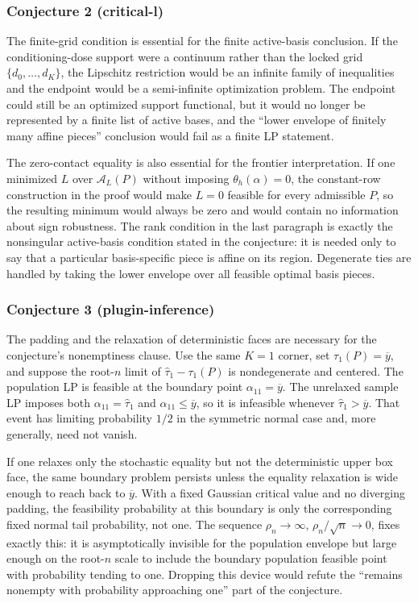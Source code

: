 \documentclass[11pt]{article}
\theoremstyle{definition}
\theoremstyle{plain}
\theoremstyle{remark}
\begin{document}
\subsubsection*{Conjecture 2 (critical-l)}
The finite-grid condition is essential for the finite active-basis conclusion.
If the conditioning-dose support were a continuum rather than the locked grid
\(\{d_0,\ldots,d_K\}\), the Lipschitz restriction would be an infinite family
of inequalities and the endpoint would be a semi-infinite optimization
problem.  The endpoint could still be an optimized support functional, but it
would no longer be represented by a finite list of active bases, and the
``lower envelope of finitely many affine pieces'' conclusion would fail as a
finite LP statement.

The zero-contact equality is also essential for the frontier interpretation.
If one minimized \(L\) over \(\mathcal A_L(P)\) without imposing
\(\theta_h(\alpha)=0\), the constant-row construction in the proof would make
\(L=0\) feasible for every admissible \(P\), so the resulting minimum would
always be zero and would contain no information about sign robustness.  The
rank condition in the last paragraph is exactly the nonsingular active-basis
condition stated in the conjecture: it is needed only to say that a particular
basis-specific piece is affine on its region.  Degenerate ties are handled by
taking the lower envelope over all feasible optimal basis pieces.

\subsubsection*{Conjecture 3 (plugin-inference)}
The padding and the relaxation of deterministic faces are necessary for the
conjecture's nonemptiness clause.  Use the same \(K=1\) corner, set
\(\tau_1(P)=\overline y\), and suppose the root-\(n\) limit of
\(\widehat\tau_1-\tau_1(P)\) is nondegenerate and centered.  The population
LP is feasible at the boundary point \(\alpha_{11}=\overline y\).  The
unrelaxed sample LP imposes both \(\alpha_{11}=\widehat\tau_1\) and
\(\alpha_{11}\le\overline y\), so it is infeasible whenever
\(\widehat\tau_1>\overline y\).  That event has limiting probability
\(1/2\) in the symmetric normal case and, more generally, need not vanish.

If one relaxes only the stochastic equality but not the deterministic upper
box face, the same boundary problem persists unless the equality relaxation
is wide enough to reach back to \(\overline y\).  With a fixed Gaussian
critical value and no diverging padding, the feasibility probability at this
boundary is only the corresponding fixed normal tail probability, not one.
The sequence \(\rho_n\to\infty\), \(\rho_n/\sqrt n\to0\), fixes exactly this:
it is asymptotically invisible for the population envelope but large enough
on the root-\(n\) scale to include the boundary population feasible point
with probability tending to one.  Dropping this device would refute the
``remains nonempty with probability approaching one'' part of the conjecture.
\end{document}
